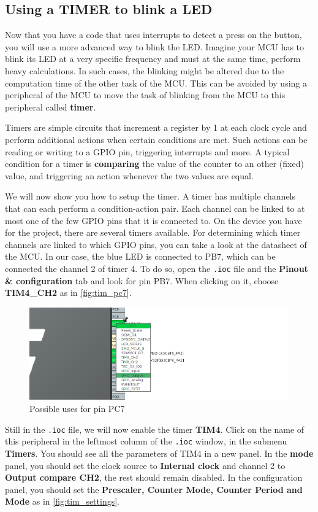 \subsection{Using a TIMER to blink a LED}
Now that you have a code that uses interrupts to detect a press on the button, you will use a more advanced way to blink the LED. Imagine your MCU has to blink its LED at a very specific frequency and must at the same time, perform heavy calculations. In such cases, the blinking might be altered due to the computation time of the other task of the MCU. This can be avoided by using a peripheral of the MCU to move the task of blinking from the MCU to this peripheral called \textbf{timer}.

Timers are simple circuits that increment a register by 1 at each clock cycle and perform additional actions when certain conditions are met. Such actions can be reading or writing to a GPIO pin, triggering interrupts and more. A typical condition for a timer is \textbf{comparing} the value of the counter to an other (fixed) value, and triggering an action whenever the two values are equal.

We will now show you how to setup the timer. A timer has multiple channels that can each perform a condition-action pair. Each channel can be linked to at most one of the few GPIO pins that it is connected to. On the device you have for the project, there are several timers available. For determining which timer channels are linked to which GPIO pins, you can take a look at the datasheet of the MCU. In our case, the blue LED is connected to PB7, which can be connected the channel 2 of timer 4. To do so, open the \texttt{.ioc} file and the \textbf{Pinout \& configuration} tab and look for pin PB7. When clicking on it, choose \textbf{TIM4\_CH2} as in \autoref{fig:tim_pc7}.
\begin{figure}[h]
    \centering
    \includegraphics[scale=0.4]{figures/timer_pc7.png}
    \caption{Possible uses for pin PC7}
    \label{fig:tim_pc7}
\end{figure}
Still in the \texttt{.ioc} file, we will now enable the timer \textbf{TIM4}. Click on the name of this peripheral in the leftmost column of the \texttt{.ioc} window, in the submenu \textbf{Timers}. You should see all the parameters of TIM4 in a new panel. In the \textbf{mode} panel, you should set the clock source to \textbf{Internal clock} and channel 2 to \textbf{Output compare CH2}, the rest should remain disabled. In the configuration panel, you should set the \textbf{Prescaler, Counter Mode, Counter Period and Mode} as in \autoref{fig:tim_settings}.

